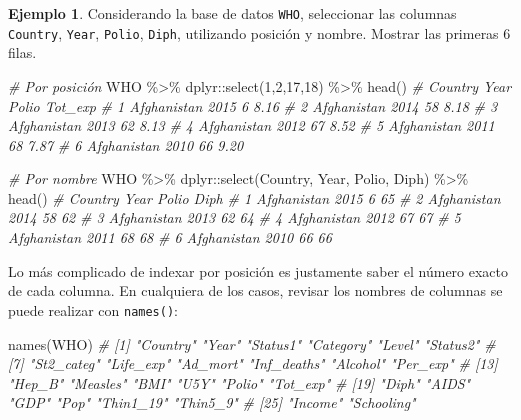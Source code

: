 \documentclass[
]{article}
\newenvironment{Shaded}{\begin{snugshade}}{\end{snugshade}}
\newcommand{\CommentTok}[1]{\textcolor[rgb]{0.56,0.35,0.01}{\textit{#1}}}
\newcommand{\DecValTok}[1]{\textcolor[rgb]{0.00,0.00,0.81}{#1}}
\newcommand{\FunctionTok}[1]{\textcolor[rgb]{0.00,0.00,0.00}{#1}}
\newcommand{\NormalTok}[1]{#1}
\newcommand{\SpecialCharTok}[1]{\textcolor[rgb]{0.00,0.00,0.00}{#1}}
\theoremstyle{definition}
\theoremstyle{definition}
\newtheorem{example}{Ejemplo}[section]
\theoremstyle{definition}
\theoremstyle{definition}
\theoremstyle{remark}
\begin{document}
\begin{example}

Considerando la base de datos \texttt{WHO}, seleccionar las columnas \texttt{Country}, \texttt{Year}, \texttt{Polio}, \texttt{Diph}, utilizando posición y nombre. Mostrar las primeras 6 filas.

\begin{Shaded}
\begin{Highlighting}[]
\CommentTok{\# Por posición}
\NormalTok{WHO }\SpecialCharTok{\%\textgreater{}\%} 
\NormalTok{  dplyr}\SpecialCharTok{::}\FunctionTok{select}\NormalTok{(}\DecValTok{1}\NormalTok{,}\DecValTok{2}\NormalTok{,}\DecValTok{17}\NormalTok{,}\DecValTok{18}\NormalTok{) }\SpecialCharTok{\%\textgreater{}\%} 
  \FunctionTok{head}\NormalTok{()}
\CommentTok{\#       Country Year Polio Tot\_exp}
\CommentTok{\# 1 Afghanistan 2015     6    8.16}
\CommentTok{\# 2 Afghanistan 2014    58    8.18}
\CommentTok{\# 3 Afghanistan 2013    62    8.13}
\CommentTok{\# 4 Afghanistan 2012    67    8.52}
\CommentTok{\# 5 Afghanistan 2011    68    7.87}
\CommentTok{\# 6 Afghanistan 2010    66    9.20}

\CommentTok{\# Por nombre}
\NormalTok{WHO }\SpecialCharTok{\%\textgreater{}\%} 
\NormalTok{  dplyr}\SpecialCharTok{::}\FunctionTok{select}\NormalTok{(Country, Year, Polio, Diph) }\SpecialCharTok{\%\textgreater{}\%} 
  \FunctionTok{head}\NormalTok{()}
\CommentTok{\#       Country Year Polio Diph}
\CommentTok{\# 1 Afghanistan 2015     6   65}
\CommentTok{\# 2 Afghanistan 2014    58   62}
\CommentTok{\# 3 Afghanistan 2013    62   64}
\CommentTok{\# 4 Afghanistan 2012    67   67}
\CommentTok{\# 5 Afghanistan 2011    68   68}
\CommentTok{\# 6 Afghanistan 2010    66   66}
\end{Highlighting}
\end{Shaded}

\end{example}

Lo más complicado de indexar por posición es justamente saber el número exacto de cada columna. En cualquiera de los casos, revisar los nombres de columnas se puede realizar con \texttt{names()}:

\begin{Shaded}
\begin{Highlighting}[]
\FunctionTok{names}\NormalTok{(WHO)}
\CommentTok{\#  [1] "Country"    "Year"       "Status1"    "Category"   "Level"      "Status2"   }
\CommentTok{\#  [7] "St2\_categ"  "Life\_exp"   "Ad\_mort"    "Inf\_deaths" "Alcohol"    "Per\_exp"   }
\CommentTok{\# [13] "Hep\_B"      "Measles"    "BMI"        "U5Y"        "Polio"      "Tot\_exp"   }
\CommentTok{\# [19] "Diph"       "AIDS"       "GDP"        "Pop"        "Thin1\_19"   "Thin5\_9"   }
\CommentTok{\# [25] "Income"     "Schooling"}
\end{Highlighting}
\end{Shaded}
\end{document}
